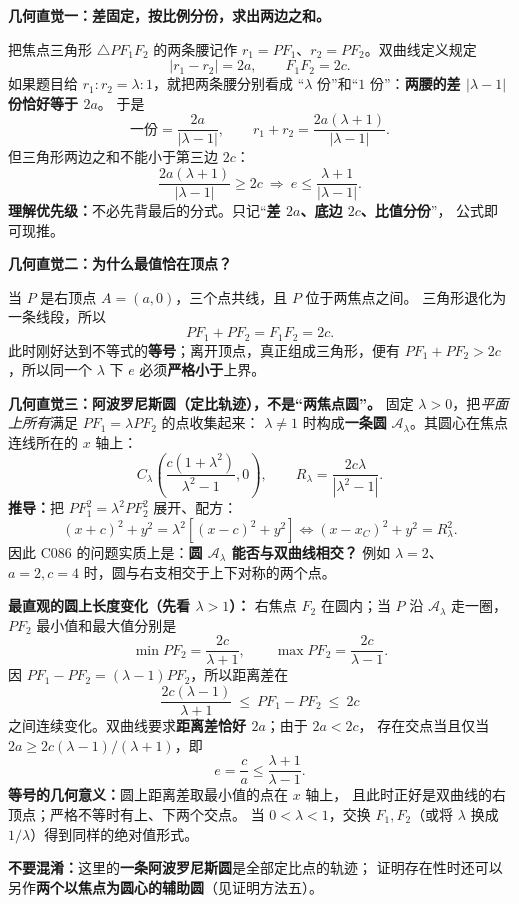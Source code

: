 \clearpage
\begin{explanationbox}
\textbf{几何直觉一：差固定，按比例分份，求出两边之和。}

把焦点三角形 $\triangle PF_1F_2$ 的两条腰记作
$r_1=PF_1$、$r_2=PF_2$。双曲线定义规定
\[
\boxed{|r_1-r_2|=2a},\qquad \boxed{F_1F_2=2c}.
\]
如果题目给 $r_1:r_2=\lambda:1$，就把两条腰分别看成
“$\lambda$ 份”和“$1$ 份”：\textbf{两腰的差 $|\lambda-1|$ 份恰好等于 $2a$}。
于是
\[
\text{一份}=\frac{2a}{|\lambda-1|},\qquad
r_1+r_2=\frac{2a(\lambda+1)}{|\lambda-1|}.
\]
但三角形两边之和不能小于第三边 $2c$：
\[
\frac{2a(\lambda+1)}{|\lambda-1|}\ge2c
\ \Longrightarrow\ \boxed{e\le\frac{\lambda+1}{|\lambda-1|}}.
\]
\textbf{理解优先级：}不必先背最后的分式。只记“\textbf{差 $2a$、底边 $2c$、比值分份}”，
公式即可现推。
\end{explanationbox}

\clearpage
\begin{explanationbox}
\textbf{几何直觉二：为什么最值恰在顶点？}

当 $P$ 是右顶点 $A=(a,0)$，三个点共线，且 $P$ 位于两焦点之间。
三角形退化为一条线段，所以
\[
\boxed{PF_1+PF_2=F_1F_2=2c}.
\]
此时刚好达到不等式的\textbf{等号}；离开顶点，真正组成三角形，便有
$PF_1+PF_2>2c$，所以同一个 $\lambda$ 下 $e$ 必须\textbf{严格小于}上界。

\begin{center}\end{center}

\textbf{几何直觉三：阿波罗尼斯圆（定比轨迹），不是“两焦点圆”。}
固定 $\lambda>0$，把\emph{平面上所有}满足 $PF_1=\lambda PF_2$ 的点收集起来：
$\lambda\ne1$ 时构成\textbf{一条圆} $\mathcal A_\lambda$。其圆心在焦点连线所在的 $x$ 轴上：
\[
\boxed{C_\lambda\!\left(\frac{c(1+\lambda^2)}{\lambda^2-1},0\right)},\qquad
\boxed{R_\lambda=\frac{2c\lambda}{|\lambda^2-1|}}.
\]
\textbf{推导：}把 $PF_1^2=\lambda^2PF_2^2$ 展开、配方：
\[
(x+c)^2+y^2=\lambda^2[(x-c)^2+y^2]
\iff
(x-x_C)^2+y^2=R_\lambda^2.
\]
因此 C086 的问题实质上是：\textbf{圆 $\mathcal A_\lambda$ 能否与双曲线相交？}
例如 $\lambda=2$、$a=2,c=4$ 时，圆与右支相交于上下对称的两个点。

\begin{center}\end{center}

\textbf{最直观的圆上长度变化（先看 $\lambda>1$）：}
右焦点 $F_2$ 在圆内；当 $P$ 沿 $\mathcal A_\lambda$ 走一圈，
$PF_2$ 最小值和最大值分别是
\[
\boxed{\min PF_2=\frac{2c}{\lambda+1}},\qquad
\boxed{\max PF_2=\frac{2c}{\lambda-1}}.
\]
因 $PF_1-PF_2=(\lambda-1)PF_2$，所以距离差在
\[
\boxed{\frac{2c(\lambda-1)}{\lambda+1}}
\ \le\ PF_1-PF_2\ \le\ 2c
\]
之间连续变化。双曲线要求\textbf{距离差恰好 $2a$}；由于 $2a<2c$，
存在交点当且仅当
$2a\ge 2c(\lambda-1)/(\lambda+1)$，即
\[
\boxed{e=\frac ca\le\frac{\lambda+1}{\lambda-1}}.
\]
\textbf{等号的几何意义：}圆上距离差取最小值的点在 $x$ 轴上，
且此时正好是双曲线的右顶点；严格不等时有上、下两个交点。
当 $0<\lambda<1$，交换 $F_1,F_2$（或将 $\lambda$ 换成 $1/\lambda$）得到同样的绝对值形式。

\textbf{不要混淆：}这里的\textbf{一条阿波罗尼斯圆}是全部定比点的轨迹；
证明存在性时还可以另作\textbf{两个以焦点为圆心的辅助圆}（见证明方法五）。
\end{explanationbox}
